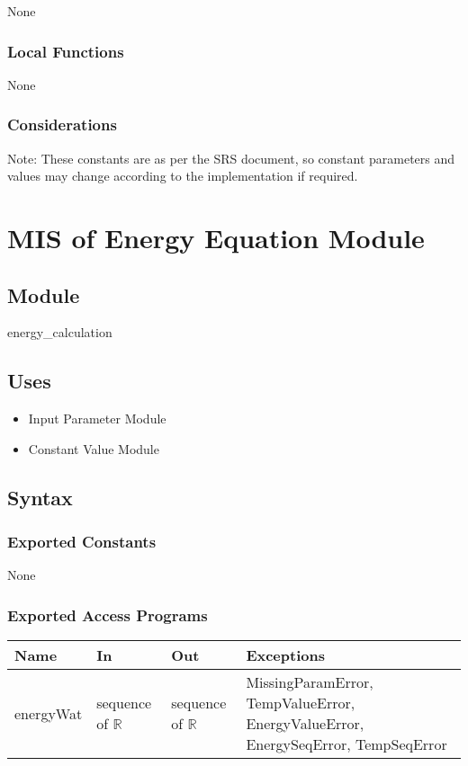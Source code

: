 \documentclass[12pt, titlepage]{article}
\begin{document}
None

\subsubsection{Local Functions}

None

\subsubsection{Considerations}
Note: These constants are as per the SRS document, so constant parameters and values may change according to the implementation if required.  

\newpage

\section{MIS of Energy Equation Module} \label{Energy_Equation_Module} 

\subsection{Module}

energy\_calculation

\subsection{Uses}

\begin{itemize}
    \item Input Parameter Module
    \item Constant Value Module
\end{itemize}

\subsection{Syntax}

\subsubsection{Exported Constants}
None

\subsubsection{Exported Access Programs}

\begin{center}
\begin{tabular}{p{1.9cm} p{5cm} p{4cm} p{3.5cm}}
\hline
\textbf{Name} & \textbf{In} & \textbf{Out} & \textbf{Exceptions} \\
\hline
energyWat & sequence of $\mathbb{R}$ & sequence of $\mathbb{R}$ & MissingParamError, TempValueError, EnergyValueError, EnergySeqError, TempSeqError \\   
\hline
\end{tabular}
\end{center}
\end{document}
